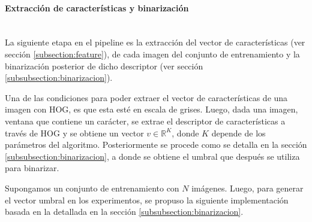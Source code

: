 
		\paragraph{Extracción de características y binarización} ~\\
		
			La siguiente etapa en el pipeline es la extracción del vector de características (ver sección \ref{subsection:feature}), de cada imagen del conjunto de entrenamiento y la binarización posterior de dicho descriptor (ver sección \ref{subsubsection:binarizacion}).
			
			Una de las condiciones para poder extraer el vector de características de una imagen con HOG, es que esta esté en escala de grises. Luego, dada una imagen, ventana que contiene un carácter, se extrae el descriptor de características a través de HOG y se obtiene un vector $v \in \mathbb{R}^{K}$, donde $K$ depende de los parámetros del algoritmo. Posteriormente se procede como se detalla en la sección \ref{subsubsection:binarizacion}, a donde se obtiene el umbral que después se utiliza para binarizar.
			
			Supongamos un conjunto de entrenamiento con $N$ imágenes. Luego, para generar el vector umbral en los experimentos, se propuso la siguiente implementación basada en la detallada en la sección \ref{subsubsection:binarizacion}.
			
